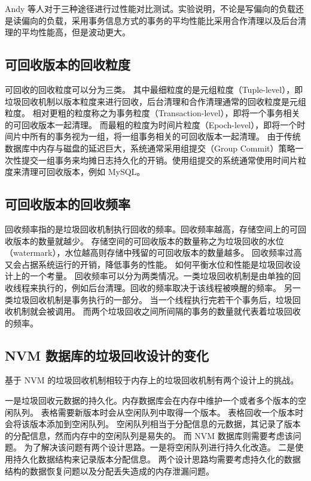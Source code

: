 Andy 等人对于三种途径进行过性能对比测试\cite{mvcc_evaluation}。实验说明，不论是写偏向的负载还是读偏向的负载，采用事务信息方式的事务的平均性能比采用合作清理以及后台清理的平均性能高，但是波动更大。


\subsection{可回收版本的回收粒度}

可回收的回收粒度可以分为三类。
其中最细粒度的是元组粒度（Tuple-level），即垃圾回收机制以版本粒度来进行回收，后台清理和合作清理通常的回收粒度是元组粒度。
相对更粗的粒度称之为事务粒度（Transaction-level），即将一个事务相关的可回收版本一起清理。
而最粗的粒度为时间片粒度（Epoch-level），即将一个时间片中所有的事务视为一组，将一组事务相关的可回收版本一起清理。
由于传统数据库中内存与磁盘的延迟巨大，系统通常采用组提交（Group Commit）策略一次性提交一组事务来均摊日志持久化的开销。使用组提交的系统通常使用时间片粒度来清理可回收版本，例如 MySQL。

\subsection{可回收版本的回收频率}

回收频率指的是垃圾回收机制执行回收的频率。回收频率越高，存储空间上的可回收版本的数量就越少。
存储空间的可回收版本的数量称之为垃圾回收的水位（watermark），水位越高则存储中残留的可回收版本的数量越多。
回收频率过高又会占据系统运行的开销，降低事务的性能。
如何平衡水位和性能是垃圾回收设计上的一个考量。
回收频率可以分为两类情况。一类垃圾回收机制是由单独的回收线程来执行的，例如后台清理。回收的频率取决于该线程被唤醒的频率。
另一类垃圾回收机制是事务执行的一部分。
当一个线程执行完若干个事务后，垃圾回收机制就会被调用。
而两个垃圾回收之间所间隔的事务的数量就代表着垃圾回收的频率。


\subsection{NVM 数据库的垃圾回收设计的变化}

基于 NVM 的垃圾回收机制相较于内存上的垃圾回收机制有两个设计上的挑战。

一是垃圾回收元数据的持久化。内存数据库会在内存中维护一个或者多个版本的空闲队列。
表格需要新版本时会从空闲队列中取得一个版本。
表格回收一个版本时会将该版本添加到空闲队列。
空闲队列相当于分配信息的元数据，其记录了版本的分配信息，然而内存中的空闲队列是易失的。
而 NVM 数据库则需要考虑该问题。
为了解决该问题有两个设计思路。一是将空闲队列进行持久化改造。
二是使用持久化数据结构来记录版本分配信息。
两个设计思路均需要考虑持久化的数据结构的数据恢复问题以及分配丢失造成的内存泄漏问题。

